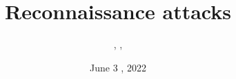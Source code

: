 \documentclass{../../extra/styles/SecureRole}
\title{Reconnaissance attacks}
\author{\Ba, \Wi, \Zm}
\date{June 3 , 2022}
\begin{document}
\makecover 

\tableofcontents

\newpage


\end{document}
